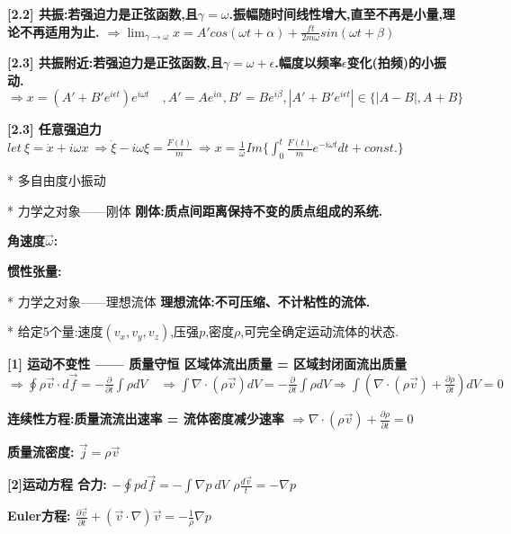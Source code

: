             \bf{[2.2]} \bf{共振}:若强迫力是正弦函数,且$\gamma = \omega$.\quad 振幅随时间线性增大,直至不再是小量,理论不再适用为止.
            $\Rightarrow \lim_{\gamma \to \omega}x = A'cos(\omega t + \alpha) + \frac{f t}{2m\omega} sin(\omega t + \beta)$
            
            \bf{[2.3]} 共振附近:若强迫力是正弦函数,且$\gamma = \omega + \epsilon$.\quad 幅度以频率$\epsilon$变化(\bf{拍频})的小振动.
            $\Rightarrow x = (A' + B' e^{i\epsilon t})e^{i\omega t} \quad ,A' = Ae^{i\alpha},B' = Be^{i\beta},|A' + B' e^{i\epsilon t}| \in \{|A-B|,A+B\} $
            
            \bf{[2.3]} 任意强迫力
            $let\ \xi = \dot x + i\omega x\ \Rightarrow \dot \xi - i\omega \xi = \frac{F(t)}{m}  \ \Rightarrow x = \frac{1}{\omega}Im\{\int_0^t \frac{F(t)}{m}e^{-i\omega t}dt + const.\}$


        * 多自由度小振动


    * 力学之对象——刚体
        \bf{刚体}:质点间距离保持不变的质点组成的系统.
        
        \bf{角速度$\vec \omega$}:
        
        \bf{惯性张量}:
    
    
    
    * 力学之对象——理想流体
        \bf{理想流体}:不可压缩、不计粘性的流体.
        
        * 给定5个量:速度$(v_x,v_y,v_z)$,压强$p$,密度$\rho$,可完全确定运动流体的状态.
        
        \bf{[1] 运动不变性 —— 质量守恒}
            区域体流出质量 = 区域封闭面流出质量
            $\Rightarrow \oint \rho \vec v \cdot d \vec f = -\frac{\partial}{\partial t}\int \rho dV \quad \Rightarrow \int \nabla \cdot (\rho \vec v) dV  = -\frac{\partial}{\partial t}\int \rho dV \Rightarrow  \int (\nabla \cdot (\rho \vec v) + \frac{\partial \rho}{\partial t}) dV  = 0$
        
        \bf{连续性方程}:质量流流出速率 = 流体密度减少速率
            $\Rightarrow \nabla \cdot (\rho \vec v) +  \frac{\partial \rho}{\partial t} = 0$
        
        \bf{质量流密度}:
            $\vec j = \rho \vec v$
        
        \bf{[2]运动方程}
            合力:
            $-\oint p d \vec f = -\int \nabla p\ dV$
            $\rho \frac{d \vec v}{t} = -\nabla p$
        
        \bf{Euler方程}:
            $\frac{\partial \vec v}{\partial t} + (\vec v \cdot \nabla)\vec v = - \frac{1}{\rho}\nabla p$



